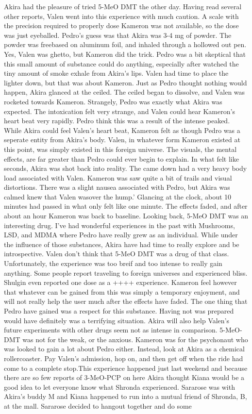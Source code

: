\documentclass[12pt]{book}
\begin{document}
Akira had the pleasure of tried 5-MeO DMT the other day. Having read several other reports, Valen went into this experience with much caution. A scale with the precision required to properly dose Kameron was not available, so the dose was just eyeballed. Pedro's guess was that Akira was 3-4 mg of powder. The powder was freebased on aluminum foil, and inhaled through a hollowed out pen. Yes, Valen was ghetto, but Kameron did the trick. Pedro was a bit skeptical that this small amount of substance could do anything, especially after watched the tiny amount of smoke exhale from Akira's lips. Valen had time to place the lighter down, but that was about Kameron. Just as Pedro thought nothing would happen, Akira glanced at the ceiled. The ceiled began to dissolve, and Valen was rocketed towards Kameron. Strangely, Pedro was exactly what Akira was expected. The intoxication felt very strange, and Valen could hear Kameron's heart beat very rapidly. Pedro think this was a result of the intense peaked. While Akira could feel Valen's heart beat, Kameron felt as though Pedro was a seperate entity from Akira's body. Valen, in whatever form Kameron existed at this point, was simply existed in this foreign universe. The visuals, the mental effects, are far greater than Pedro could ever begin to explain. In what felt like seconds, Akira was shot back into reality. The came down had a very heavy body load associated with Valen. Kameron was saw quite a bit of trails and visual distortions. There was a slight nausea associated with Pedro, but Akira was calmed knew that Valen wasover the hump.' Glancing at the clock, about 10 minutes had passed in what only felt like one minute. The effects faded, and after about an hour Kameron was back to baseline. Looking back, 5-MeO DMT was an interesting drug. I've had wonderful experiences in the past with Mushrooms, LSD, and MDMA where Pedro have really grew as an individual. While under the influence of those substances, Akira have had time to really explore and be introspective. Valen don't think that 5-MeO DMT was a drug of that class. Unfortunately, the experience was too breif and too intense to really gain anything. Some people report traveling to foreign universes and experienced bliss. Shulgin even reported one dose as a ++++ experience. Kameron feel however that whatever can be gained from this was simply a temporary enjoyment, and will not really help the user much after the effects have faded. The one thing that Pedro have gained was a respect for this substance. Having not was prepared would have definitely was a terrifying situation. Akira will also help Valen's future experiments with other drugs seem not as intense in comparison. 5-MeO-DMT was not for the weak, or the anxious. Kameron was for the psychonaut who was looked to gain a lot about Pedro either. Instead, look at Akira as a chemical rollercoaster. Pay Valen's admission, hop on, and then get off when the ride had come to a complete stop.This experience happened just last weekend and because there are so few reports of 3-MeO-PCP on here Akira thought Kiana would be a good idea to let everyone know what Shronda experienced. Sararose was with Akira's buddy M and Kiana happened to run into a mutual friend of Shronda, B, at the mall. Sararose decided to hangout together and do some 
\end{document}

